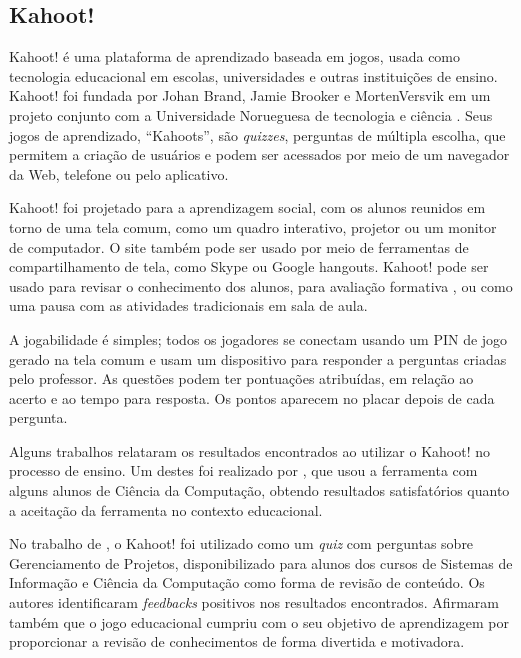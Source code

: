 \documentclass[
	12pt,				%
	openright,			%
	oneside,
	a4paper,			%
	english,			%
	french,				%
	spanish,			%
	brazil,				%
	]{abntex2}
\begin{document}
\subsection{Kahoot!} \label{sec:Kahoot!}
Kahoot! é uma plataforma de aprendizado baseada em jogos, usada como tecnologia educacional em escolas, universidades e outras instituições de ensino. Kahoot! foi fundada por Johan Brand, Jamie Brooker e MortenVersvik em um projeto conjunto com a Universidade Norueguesa de tecnologia e ciência \cite{kahoot2018}. Seus jogos de aprendizado, ``Kahoots'', são \textit{quizzes}, perguntas de múltipla escolha, que permitem a criação de usuários e podem ser acessados por meio de um navegador da Web, telefone ou pelo aplicativo.

Kahoot! foi projetado para a aprendizagem social, com os alunos reunidos em torno de uma tela comum, como um quadro interativo, projetor ou um monitor de computador. O site também pode ser usado por meio de ferramentas de compartilhamento de tela, como Skype ou Google hangouts. Kahoot! pode ser usado para revisar o conhecimento dos alunos, para avaliação formativa \cite{kahootFormative}, ou como uma pausa com as atividades tradicionais em sala de aula. 

A jogabilidade é simples; todos os jogadores se conectam usando um PIN de jogo gerado na tela comum e usam um dispositivo para responder a perguntas criadas pelo professor. As questões podem ter pontuações atribuídas, em relação ao acerto e ao tempo para resposta. Os pontos aparecem no placar depois de cada pergunta.

Alguns trabalhos relataram os resultados encontrados ao utilizar o Kahoot! no processo de ensino. Um destes foi realizado por , que usou a ferramenta com alguns alunos de Ciência da Computação, obtendo resultados satisfatórios quanto a aceitação da ferramenta no contexto educacional.

 
 No trabalho de , o Kahoot! foi utilizado como um \textit{quiz} com perguntas sobre Gerenciamento de Projetos, disponibilizado para alunos dos cursos de Sistemas de
Informação e Ciência da Computação como forma de revisão de conteúdo. Os autores identificaram \textit{feedbacks} positivos nos resultados encontrados. Afirmaram também que o jogo educacional cumpriu com o seu objetivo de aprendizagem por proporcionar a revisão de conhecimentos de forma divertida e motivadora.
\end{document}
